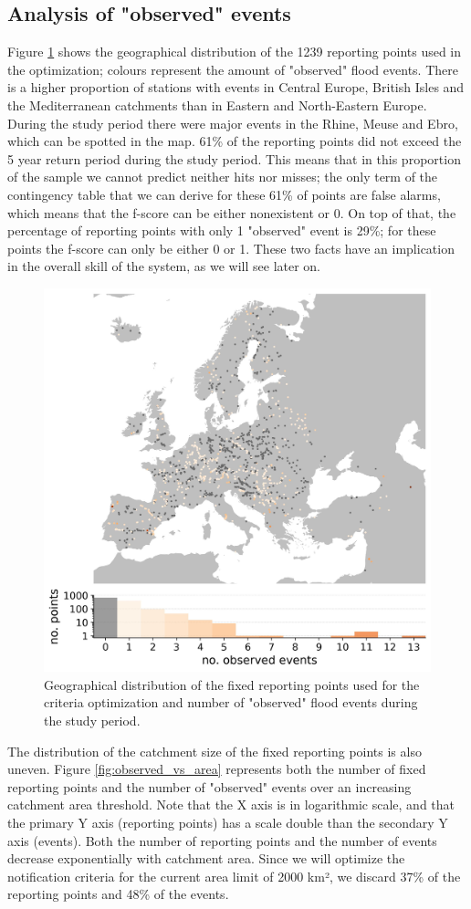 \documentclass[preprint,12pt]{elsarticle}
\begin{document}
\subsection{Analysis of "observed" events}
\label{sec:obs_events}

Figure \ref{fig:map_observed} shows the geographical distribution of the 1239 reporting points used in the optimization; colours represent the amount of "observed" flood events. There is a higher proportion of stations with events in Central Europe, British Isles and the Mediterranean catchments than in Eastern and North-Eastern Europe. During the study period there were major events in the Rhine, Meuse and Ebro, which can be spotted in the map. 61\% of the reporting points did not exceed the 5 year return period during the study period. This means that in this proportion of the sample we cannot predict neither hits nor misses; the only term of the contingency table that we can derive for these 61\% of points are false alarms, which means that the f-score  can be either nonexistent or 0. On top of that, the percentage of reporting points with only 1 "observed" event is 29\%; for these points the f-score can only be either 0 or 1. These two facts have an implication in the overall skill of the system, as we will see later on.

\begin{figure}
    \centering
    \includegraphics[width=0.5\linewidth]{figures/map_observed_events_2000km2_1239points.jpg}
    \caption{Geographical distribution of the fixed reporting points used for the criteria optimization and number of "observed" flood events during the study period.}
    \label{fig:map_observed}
\end{figure}

The distribution of the catchment size of the fixed reporting points is also uneven. Figure \ref{fig:observed_vs_area} represents both the number of fixed reporting points and the number of "observed" events over an increasing catchment area threshold. Note that the X axis is in logarithmic scale, and that the primary Y axis (reporting points) has a scale double than the secondary Y axis (events). Both the number of reporting points and the number of events decrease exponentially with catchment area. Since we will optimize the notification criteria for the current area limit of 2000 km², we discard 37\% of the reporting points and 48\% of the events.
\end{document}
